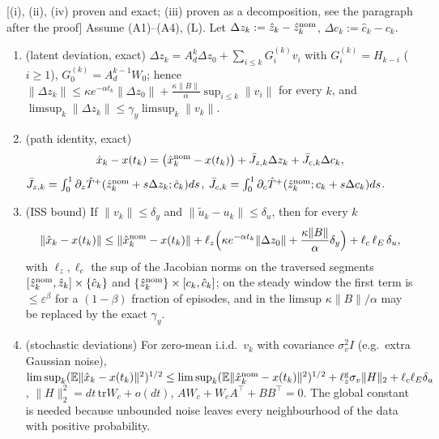 \begin{proposition}\label{prop:m3-iss}
[(i), (ii), (iv) proven and exact; (iii) proven as a decomposition, see the paragraph after the proof]
Assume (A1)--(A4), (L). Let $\Delta z_k:=\hat z_k-\hat z^{\rm nom}_k$, $\Delta c_k:=\hat c_k-c_k$.
\begin{enumerate}[label=(\roman*)]
\item (latent deviation, exact) $\Delta z_k=A_d^k\Delta z_0+\sum_{i\le k}G^{(k)}_iv_i$ with
$G^{(k)}_i=H_{k-i}$ ($i\ge1$), $G^{(k)}_0=A_d^{k-1}W_0$; hence
$\|\Delta z_k\|\le\kappa e^{-\alpha t_k}\|\Delta z_0\|+\frac{\kappa\|B\|}{\alpha}\sup_{i\le k}\|v_i\|$ for every $k$,
and $\limsup_k\|\Delta z_k\|\le\gamma_y\limsup_k\|v_k\|$.
\item (path identity, exact)
\begin{equation}\label{eq:m3-identity}
\hat x_k-x(t_k)=\big(\hat x^{\rm nom}_k-x(t_k)\big)+\bar J_{z,k}\Delta z_k+\bar J_{c,k}\Delta c_k,
\end{equation}
$\bar J_{z,k}=\int_0^1\partial_z\hat T^{+}(\hat z^{\rm nom}_k+s\Delta z_k;\hat c_k)ds$,
$\bar J_{c,k}=\int_0^1\partial_c\hat T^{+}(\hat z^{\rm nom}_k;c_k+s\Delta c_k)ds$.
\item (ISS bound) If $\|v_k\|\le\delta_y$ and $\|\tilde u_k-u_k\|\le\delta_u$, then for every $k$
\begin{equation}\label{eq:m3-iss}
\|\hat x_k-x(t_k)\|\le\|\hat x^{\rm nom}_k-x(t_k)\|+\ell_z\Big(\kappa e^{-\alpha t_k}\|\Delta z_0\|+\frac{\kappa\|B\|}{\alpha}\delta_y\Big)+\ell_c\,\ell_E\,\delta_u ,
\end{equation}
with $\ell_z,\ell_c$ the sup of the Jacobian norms on the traversed segments
$[\hat z^{\rm nom}_k,\hat z_k]\times\{\hat c_k\}$ and $\{\hat z^{\rm nom}_k\}\times[c_k,\hat c_k]$; on the
steady window the first term is $\le\varepsilon^\beta$ for a $(1-\beta)$ fraction of episodes, and in
the limsup $\kappa\|B\|/\alpha$ may be replaced by the exact $\gamma_y$.
\item (stochastic deviations) For zero-mean i.i.d.\ $v_k$ with covariance $\sigma_v^2I$ (e.g.\ extra
Gaussian noise), $\limsup_k(\mathbb E\|\hat x_k-x(t_k)\|^2)^{1/2}\le\limsup_k(\mathbb E\|\hat x^{\rm nom}_k-x(t_k)\|^2)^{1/2}+\ell^{\rm g}_z\sigma_v\|H\|_2+\ell_c\ell_E\delta_u$,
$\|H\|_2^2=dt\,\mathrm{tr}W_c+o(dt)$, $AW_c+W_cA^\top+BB^\top=0$. The global constant is needed because
unbounded noise leaves every neighbourhood of the data with positive probability.
\end{enumerate}
\end{proposition}

